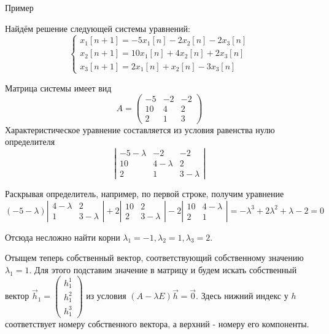 \documentclass[12pt,twoside]{report}
\theoremstyle{MyNonumberplain}
\begin{document}
    \begin{example}{Пример}
        
    Найдём решение следующей системы уравнений:
    \begin{equation*}
        \begin{cases}
            x_1[n+1]= -5x_1[n]-2x_2[n]-2x_3[n]\\
            x_2[n+1]= 10x_1[n]+4x_2[n]+2x_3[n]\\
            x_3[n+1]= 2x_1[n]+x_2[n]-3x_3[n]
        \end{cases}
    \end{equation*}

    Матрица системы имеет вид
    \[
        A=\left(
            \begin{array}{ccc}
                -5 &-2 &-2\\
                10 &4 &2\\
                2 &1 &3
            \end{array}
        \right)
    \]
    Характеристическое уравнение составляется из условия равенства нулю определителя
    \[
        \left|
            \begin{array}{ccc}
                -5-\lambda&-2 &-2\\
                10 &4-\lambda &2\\
                2 &1 &3-\lambda
            \end{array}
        \right|
    \]
    
    Раскрывая определитель, например, по первой строке, получим уравнение
    \begin{equation*}
        (-5-\lambda)\left|\begin{array}{cc}4-\lambda & 2 \\ 1 & 3-\lambda\end{array}\right|
        +2\left|\begin{array}{cc}10 & 2\\ 2 & 3-\lambda \end{array}\right|-
        2\left|\begin{array}{cc}10 & 4-\lambda \\ 2 & 1 \end{array}\right|
        = -\lambda^3+2\lambda^2+\lambda-2=0
    \end{equation*}
    
    Отсюда несложно найти корни $\lambda_1=-1, \lambda_2=1, \lambda_3=2$.

    Отыщем теперь собственный вектор, соответствующий собственному значению $\lambda_1=1$. Для этого подставим
    значение в матрицу и будем искать собственный вектор $\vec{h}_1=\begin{pmatrix}
        h^1_1\\h^2_1\\h^3_1
    \end{pmatrix}$ из условия $(A-\lambda E)\vec{h}=\vec{0}$. Здесь нижний индекс у $h$ соответствует номеру
    собственного вектора, а верхний - номеру его компоненты.


\end{example}
\end{document}
